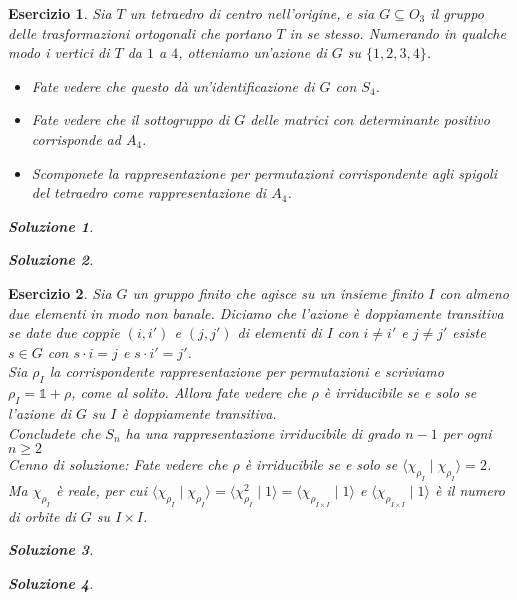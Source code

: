 \documentclass[a4paper]{article}
\theoremstyle{break}
\newtheorem{ex}{{ \Large Esercizio} }
\theoremstyle{plain}
\newtheorem{sol}{Soluzione}[ex]
\begin{document}
\begin{ex}
Sia $T$ un tetraedro di centro nell'origine, e sia $G \subseteq O_3$ il gruppo delle trasformazioni ortogonali che portano $T$ in se stesso. Numerando in qualche modo i vertici di $T$ da $1$ a $4$, otteniamo un’azione di $G$ su $\{1, 2, 3, 4\}$.
\begin{itemize}
\item[(a)] Fate vedere che questo dà un’identificazione di $G$ con $S_4$.

\item[(b)] Fate vedere che il sottogruppo di $G$ delle matrici con determinante positivo corrisponde ad $A_4$.

\item[(c)] Scomponete la rappresentazione per permutazioni corrispondente agli spigoli del tetraedro come rappresentazione di $A_4$.
\end{itemize}

\begin{sol}

\end{sol}

\begin{sol}

\end{sol}


\end{ex}

\begin{ex}
Sia $G$ un gruppo finito che agisce su un insieme finito $I$ con almeno due elementi in modo non banale. Diciamo che l'azione è {\it doppiamente transitiva} se date due coppie $(i, i')$ e $(j, j')$ di elementi di $I$ con $i \neq i'$ e $j \neq j'$ esiste $s \in G$ con $s \cdot i = j$ e $s \cdot i' = j'$. \\
Sia $\rho_I$ la corrispondente rappresentazione per permutazioni e scriviamo $\rho_I = \mathbb{1} + \rho$, come al solito. Allora fate vedere che $\rho$ è irriducibile se e solo se l'azione di $G$ su $I$ è doppiamente transitiva. \\
Concludete che $S_n$ ha una rappresentazione irriducibile di grado $n-1$ per ogni $n \ge 2$ \\
Cenno di soluzione: Fate vedere che $\rho$ è irriducibile se e solo se $\langle \chi_{\rho_I} \mid \chi_{\rho_I} \rangle = 2$. Ma $\chi_{\rho_I}$ è reale, per cui $\langle \chi_{\rho_I} \mid \chi_{\rho_I} \rangle = \langle \chi_{\rho_I}^2 \mid 1 \rangle = \langle \chi_{\rho_{I\times I}} \mid 1 \rangle$ e $\langle \chi_{\rho_{I\times I}} \mid 1 \rangle$ è il numero di orbite di $G$ su $I \times I$.

\begin{sol}

\end{sol}

\begin{sol}

\end{sol}


\end{ex}
\end{document}
